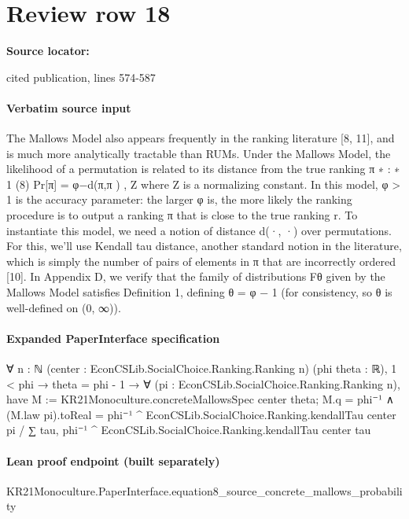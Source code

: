 \documentclass[10pt]{article}
\begin{document}
\section*{Review row 18}
\textbf{Source locator:} {\footnotesize\raggedright cited publication, lines 574-\allowbreak{}587\par}
\paragraph{Verbatim source input}
\begin{ReviewVerbatim}
The Mallows Model also appears frequently in the ranking literature [8, 11], and is much more analytically
tractable than RUMs. Under the Mallows Model, the likelihood of a permutation is related to its distance
from the true ranking π ∗ :
∗
1
(8)
Pr[π] = φ−d(π,π ) ,
Z
where Z is a normalizing constant. In this model, φ > 1 is the accuracy parameter: the larger φ is, the
more likely the ranking procedure is to output a ranking π that is close to the true ranking r. To instantiate
this model, we need a notion of distance d(·, ·) over permutations. For this, we’ll use Kendall tau distance,
another standard notion in the literature, which is simply the number of pairs of elements in π that are
incorrectly ordered [10]. In Appendix D, we verify that the family of distributions Fθ given by the Mallows
Model satisfies Definition 1, defining θ = φ − 1 (for consistency, so θ is well-defined on (0, ∞)).
\end{ReviewVerbatim}


\paragraph{Expanded PaperInterface specification}
\begin{ReviewVerbatim}
∀ {n : ℕ} (center : EconCSLib.SocialChoice.Ranking.Ranking n) (phi theta : ℝ),
  1 < phi →
    theta = phi - 1 →
      ∀ (pi : EconCSLib.SocialChoice.Ranking.Ranking n),
        have M := KR21Monoculture.concreteMallowsSpec center theta;
        M.q = phi⁻¹ ∧
          (M.law pi).toReal =
            phi⁻¹ ^ EconCSLib.SocialChoice.Ranking.kendallTau center pi /
              ∑ tau, phi⁻¹ ^ EconCSLib.SocialChoice.Ranking.kendallTau center tau
\end{ReviewVerbatim}

\paragraph{Lean proof endpoint (built separately)}\begin{ReviewVerbatim}
KR21Monoculture.PaperInterface.equation8_source_concrete_mallows_probability
\end{ReviewVerbatim}
\end{document}
